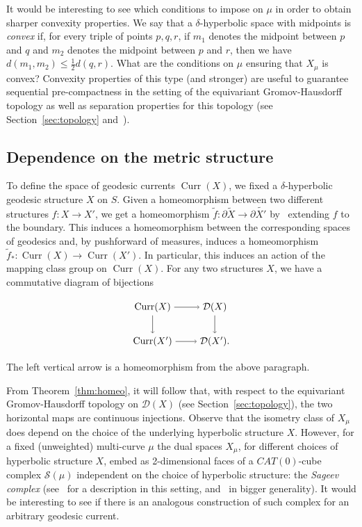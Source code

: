 \documentclass[12pt,article]{amsart}
\numberwithin{equation}{section}
\numberwithin{figure}{section}
\theoremstyle{definition}
\theoremstyle{plain}
\DeclareMathOperator{\Curr}{Curr}
\newcommand*{\wt}[1]{\widetilde{#1}}
\newcommand{\CAT}{\mathit{CAT}}
\begin{document}
 It would be interesting to see which conditions to impose on $\mu$ in order to obtain sharper convexity properties. We say that a $\delta$-hyperbolic space with midpoints is \emph{convex} if, for every triple of points $p,q,r$, if $m_1$ denotes the midpoint between $p$ and $q$ and $m_2$ denotes the midpoint between $p$ and $r$, then we have $d(m_1,m_2) \leq \frac{1}{2} d(q,r)$. What are the conditions on $\mu$ ensuring that $X_{\mu}$ is convex? Convexity properties of this type (and stronger) are useful to guarantee sequential pre-compactness in the setting of the equivariant Gromov-Hausdorff topology as well as separation properties for this topology (see Section~\ref{sec:topology} and~\cite[Chapter~4]{Pau88:Thesis}).



  \subsection{Dependence on the metric structure}

\label{subsec:dependence}
To define the space of geodesic currents $\Curr(X)$, we fixed a $\delta$-hyperbolic geodesic structure $X$ on $S$.
Given a homeomorphism between two different structures $f \colon X \to X'$, we get a homeomorphism $\wt{f} \colon \partial \wt{X} \to \partial \wt{X'}$ by~\cite[Lemma~3.7]{BC88:AutomorphismsSurfaces} extending $f$ to the boundary. This induces a homeomorphism between the corresponding spaces of geodesics and, by pushforward of measures, 
 induces a homeomorphism $\wt{f}_* \colon \Curr(X) \to \Curr(X')$.
 In particular, this induces an action of the mapping class group on $\Curr(X)$.
 For any two structures $X$, we have a commutative diagram of bijections

 \[
  \begin{tikzpicture}[x=2.25cm,y=1.25cm]
    \node (simples) at (0,0) {$\Curr(X)$};
    \node (laminations) at (1,0) {$\mathcal{D}(X)$};
    \node (curves) at (0,-1) {$\Curr(X')$};
    \node (currents) at (1,-1) {$\mathcal{D}(X')$.};
    \draw[-to] (simples) to (curves);
    \draw[-to] (simples) to (laminations);
    \draw[-to] (curves) to (currents);
    \draw[-to] (laminations) to (currents);
  \end{tikzpicture}
\]
The left vertical arrow is a homeomorphism from the above paragraph.

From Theorem~\ref{thm:homeo}, it will follow that, with respect to the equivariant Gromov-Hausdorff topology on $\mathcal{D}(X)$ (see Section~\ref{sec:topology}), the two horizontal maps are continuous injections.
Observe that the isometry class of $X_{\mu}$ does depend on the choice of the underlying hyperbolic structure $X$.
However, for a fixed (unweighted) multi-curve $\mu$ the dual spaces $X_{\mu}$, for different choices of hyperbolic structure $X$, embed as 2-dimensional faces of a $\CAT(0)$-cube complex $\mathcal{S}(\mu)$ independent on the choice of hyperbolic structure: the \emph{Sageev complex} (see~\cite[3]{AG17:Dualcubecomplex} for a description in this setting, and~\cite{CN05:Walls,S01:Cube1,S02:Cube2} in bigger generality). It would be interesting to see if there is an analogous construction of such complex for an arbitrary geodesic current.
\end{document}
